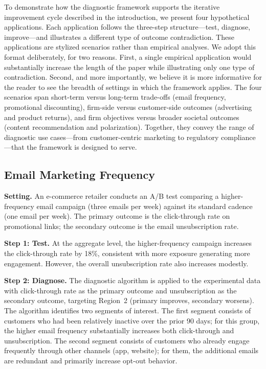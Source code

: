 \documentclass[11pt,letterpaper,english]{article}
\theoremstyle{definition}
\theoremstyle{definition}
\begin{document}
\begin{bibunit}
To demonstrate how the diagnostic framework supports the iterative improvement cycle described in the introduction, we present four hypothetical applications. Each application follows the three-step structure---test, diagnose, improve---and illustrates a different type of outcome contradiction. These applications are stylized scenarios rather than empirical analyses. We adopt this format deliberately, for two reasons. First, a single empirical application would substantially increase the length of the paper while illustrating only one type of contradiction. Second, and more importantly, we believe it is more informative for the reader to see the breadth of settings in which the framework applies. The four scenarios span short-term versus long-term trade-offs (email frequency, promotional discounting), firm-side versus customer-side outcomes (advertising and product returns), and firm objectives versus broader societal outcomes (content recommendation and polarization). Together, they convey the range of diagnostic use cases---from customer-centric marketing to regulatory compliance---that the framework is designed to serve.

\subsection{Email Marketing Frequency}
\label{sec:app-email}

\noindent
\textbf{Setting.} An e-commerce retailer conducts an A/B test comparing a higher-frequency email campaign (three emails per week) against its standard cadence (one email per week). The primary outcome is the click-through rate on promotional links; the secondary outcome is the email unsubscription rate.

\vspace{4pt}
\noindent
\textbf{Step 1: Test.}
At the aggregate level, the higher-frequency campaign increases the click-through rate by 18\%, consistent with more exposure generating more engagement. However, the overall unsubscription rate also increases modestly.

\vspace{4pt}
\noindent
\textbf{Step 2: Diagnose.}
The diagnostic algorithm is applied to the experimental data with click-through rate as the primary outcome and unsubscription as the secondary outcome, targeting Region~2 (primary improves, secondary worsens). The algorithm identifies two segments of interest. The first segment consists of customers who had been relatively inactive over the prior 90 days; for this group, the higher email frequency substantially increases both click-through and unsubscription. The second segment consists of customers who already engage frequently through other channels (app, website); for them, the additional emails are redundant and primarily increase opt-out behavior.


\end{bibunit}
\end{document}
